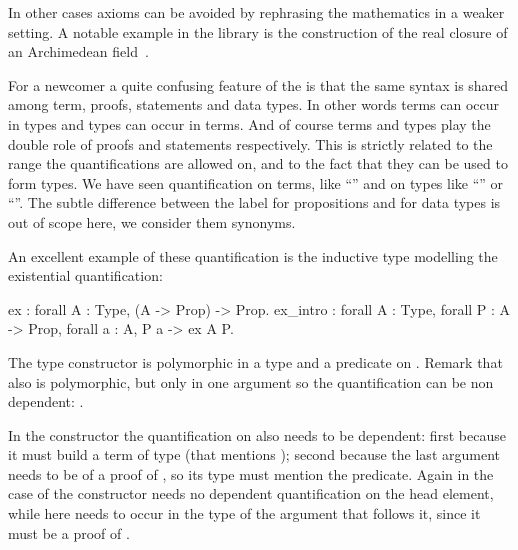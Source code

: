 In other cases axioms can be avoided by rephrasing the mathematics
in a weaker setting.  A notable example in the \mcbMC{} library
is the construction of the real closure of an Archimedean
field~\cite{DBLP:conf/itp/Cohen12}.



For a newcomer
a quite confusing feature of the \mcbCIC{} is that the same syntax
is shared among term, proofs, statements and data types.  In other words terms
can occur in types and types can occur in terms.  And of course terms and
types play the double role of proofs and statements respectively.
This is strictly related to the range the quantifications are allowed on,
and to the fact that they can be used to form types.
We have seen quantification on terms, like ``'' and on types
like ``'' or ``''.  The subtle difference
between the label  for propositions and  for data types
is out of scope here, we consider them synonyms.

An excellent example of these quantification is the inductive type
modelling the existential quantification:

\begin{coq}{}{}
ex : forall A : Type, (A -> Prop) -> Prop.
ex_intro : forall A : Type, forall P : A -> Prop, forall a : A, P a -> ex A P.
\end{coq}

The  type constructor is polymorphic in a type  and a predicate
on .  Remark that also  is polymorphic, but only in one argument
so the quantification can be non dependent: .

In the constructor  the quantification on  also needs to be
dependent: first because it must build a term of type  (that
mentions ); second because the last argument needs to be of a proof of
, so its type must mention the predicate.  Again in the case of 
the constructor  needs no dependent
quantification on the head element, while here  needs to occur in
the type of the argument that follows it, since it must be a proof of
.

%
%
%
%
%
%
%
%
%

